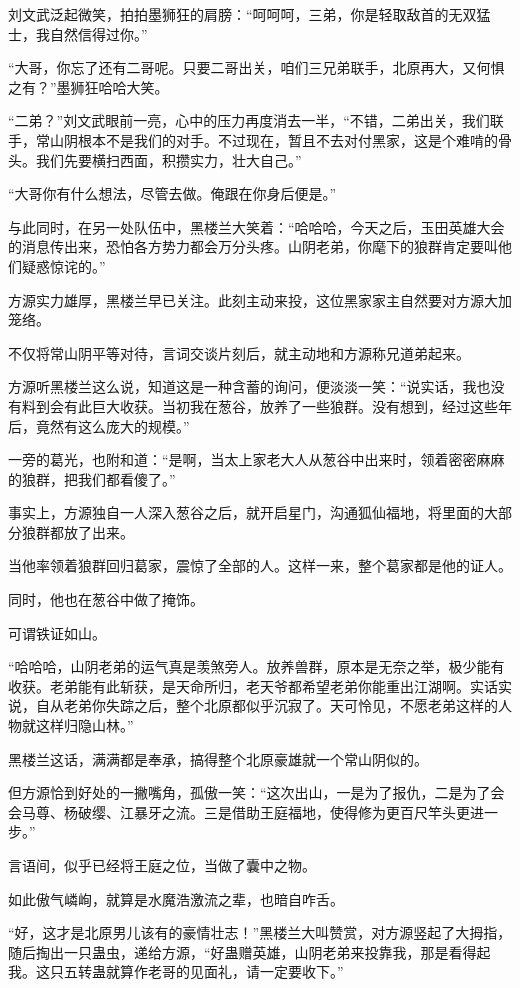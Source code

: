 \begin{this_body}
刘文武泛起微笑，拍拍墨狮狂的肩膀：“呵呵呵，三弟，你是轻取敌首的无双猛士，我自然信得过你。”

“大哥，你忘了还有二哥呢。只要二哥出关，咱们三兄弟联手，北原再大，又何惧之有？”墨狮狂哈哈大笑。

“二弟？”刘文武眼前一亮，心中的压力再度消去一半，“不错，二弟出关，我们联手，常山阴根本不是我们的对手。不过现在，暂且不去对付黑家，这是个难啃的骨头。我们先要横扫西面，积攒实力，壮大自己。”

“大哥你有什么想法，尽管去做。俺跟在你身后便是。”

与此同时，在另一处队伍中，黑楼兰大笑着：“哈哈哈，今天之后，玉田英雄大会的消息传出来，恐怕各方势力都会万分头疼。山阴老弟，你麾下的狼群肯定要叫他们疑惑惊诧的。”

方源实力雄厚，黑楼兰早已关注。此刻主动来投，这位黑家家主自然要对方源大加笼络。

不仅将常山阴平等对待，言词交谈片刻后，就主动地和方源称兄道弟起来。

方源听黑楼兰这么说，知道这是一种含蓄的询问，便淡淡一笑：“说实话，我也没有料到会有此巨大收获。当初我在葱谷，放养了一些狼群。没有想到，经过这些年后，竟然有这么庞大的规模。”

一旁的葛光，也附和道：“是啊，当太上家老大人从葱谷中出来时，领着密密麻麻的狼群，把我们都看傻了。”

事实上，方源独自一人深入葱谷之后，就开启星门，沟通狐仙福地，将里面的大部分狼群都放了出来。

当他率领着狼群回归葛家，震惊了全部的人。这样一来，整个葛家都是他的证人。

同时，他也在葱谷中做了掩饰。

可谓铁证如山。

“哈哈哈，山阴老弟的运气真是羡煞旁人。放养兽群，原本是无奈之举，极少能有收获。老弟能有此斩获，是天命所归，老天爷都希望老弟你能重出江湖啊。实话实说，自从老弟你失踪之后，整个北原都似乎沉寂了。天可怜见，不愿老弟这样的人物就这样归隐山林。”

黑楼兰这话，满满都是奉承，搞得整个北原豪雄就一个常山阴似的。

但方源恰到好处的一撇嘴角，孤傲一笑：“这次出山，一是为了报仇，二是为了会会马尊、杨破缨、江暴牙之流。三是借助王庭福地，使得修为更百尺竿头更进一步。”

言语间，似乎已经将王庭之位，当做了囊中之物。

如此傲气嶙峋，就算是水魔浩激流之辈，也暗自咋舌。

“好，这才是北原男儿该有的豪情壮志！”黑楼兰大叫赞赏，对方源竖起了大拇指，随后掏出一只蛊虫，递给方源，“好蛊赠英雄，山阴老弟来投靠我，那是看得起我。这只五转蛊就算作老哥的见面礼，请一定要收下。”


\end{this_body}
